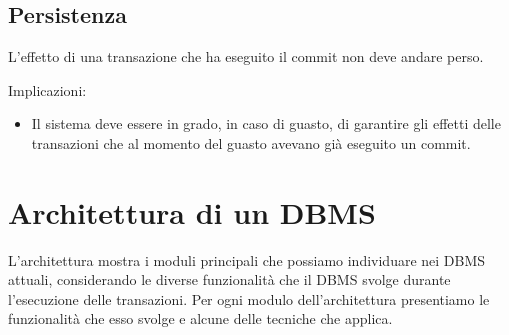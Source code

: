 \documentclass[a4paper, 10pt]{article}
\theoremstyle{definition}
\begin{document}
	\subsection{Persistenza}
	L'effetto di una transazione che ha eseguito il commit non deve andare
	perso.
	
	Implicazioni:
	\begin{itemize}
		\item Il sistema deve essere in grado, in caso di guasto, di garantire gli
		effetti delle transazioni che al momento del guasto avevano già
		eseguito un commit.
	\end{itemize}

\newpage
		
	\section{Architettura di un DBMS}
	L'architettura mostra i moduli principali che
	possiamo individuare nei DBMS attuali, considerando
	le diverse funzionalità che il DBMS svolge durante
	l'esecuzione delle transazioni.
	Per ogni modulo dell'architettura presentiamo le
	funzionalità che esso svolge e alcune delle tecniche che
	applica.
	
	\bigskip
	
\end{document}
